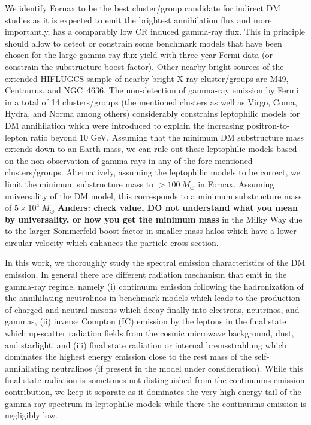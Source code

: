 \documentclass[10pt,aps,pra,reprint,amsmath,amsfonts,amssymb,showpacs,nofootinbib,floatfix]{revtex4-1}
\newcommand{\msun}{M_\odot}
\begin{document}
We identify Fornax to be the best cluster/group candidate for indirect
DM studies as it is expected to emit the brightest annihilation flux
and more importantly, has a comparably low CR induced gamma-ray flux.
This in principle should allow to detect or constrain some benchmark
models that have been chosen for the large gamma-ray flux yield with
three-year Fermi data (or constrain the substructure boost
factor). Other nearby bright sources of the extended HIFLUGCS sample
of nearby bright X-ray cluster/groups are M49, Centaurus, and
NGC~4636.  The non-detection of gamma-ray emission by Fermi in a total
of 14 clusters/groups (the mentioned clusters as well as Virgo, Coma,
Hydra, and Norma among others) considerably constrains leptophilic
models for DM annihilation which were introduced to explain the
increasing positron-to-lepton ratio beyond 10 GeV. Assuming that the
minimum DM substructure mass extends down to an Earth mass, we can
rule out these leptophilic models based on the non-observation of
gamma-rays in any of the fore-mentioned
clusters/groups. Alternatively, assuming the leptophilic models to be
correct, we limit the minimum substructure mass to $>100~\msun$ in
Fornax. Assuming universality of the DM model, this corresponds to a
minimum substructure mass of $5\times 10^4~\msun$ {\bf Anders: check
  value, DO not understand what you mean by universality, or how you
  get the minimum mass} in the Milky Way due to the larger Sommerfeld
boost factor in smaller mass halos which have a lower circular
velocity which enhances the particle cross section.

In this work, we thoroughly study the spectral emission
characteristics of the DM emission. In general there are different
radiation mechanism that emit in the gamma-ray regime, namely (i)
continuum emission following the hadronization of the annihilating
neutralinos in benchmark models which leads to the production of
charged and neutral mesons which decay finally into electrons,
neutrinos, and gammas, (ii) inverse Compton (IC) emission by the
leptons in the final state which up-scatter radiation fields from the
cosmic microwave background, dust, and starlight, and (iii) final
state radiation or internal bremsstrahlung which dominates the highest
energy emission close to the rest mass of the self-annihilating
neutralinos (if present in the model under consideration). While this
final state radiation is sometimes not distinguished from the
continuums emission contribution, we keep it separate as it dominates
the very high-energy tail of the gamma-ray spectrum in leptophilic
models while there the continuums emission is negligibly low.
\end{document}

